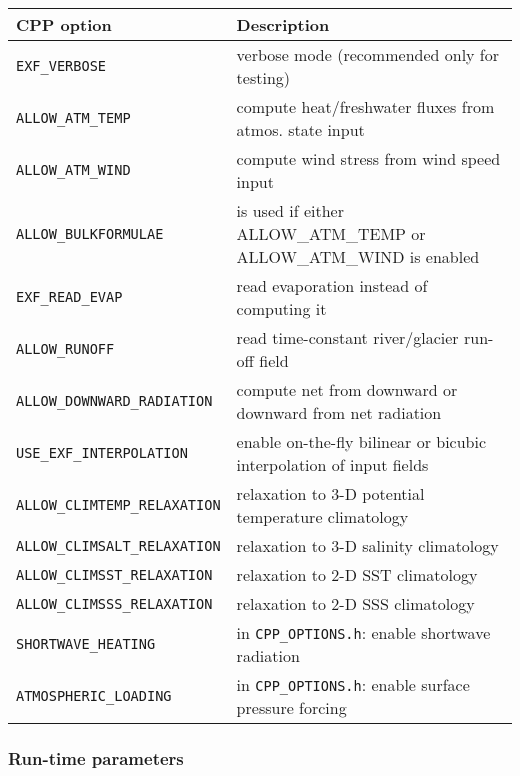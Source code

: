\begin{table}[b!]
  \label{tab:pkg:exf:cpp}
  {\footnotesize
    \begin{tabular}{|l|l|}
      \hline 
      \textbf{CPP option}  &  \textbf{Description}  \\
      \hline \hline
        \texttt{EXF\_VERBOSE} & 
          verbose mode (recommended only for testing) \\
        \texttt{ALLOW\_ATM\_TEMP} & 
          compute heat/freshwater fluxes from atmos. state input \\
        \texttt{ALLOW\_ATM\_WIND} & 
          compute wind stress from wind speed input\\
        \texttt{ALLOW\_BULKFORMULAE} & 
          is used if either ALLOW\_ATM\_TEMP or ALLOW\_ATM\_WIND is enabled \\
        \texttt{EXF\_READ\_EVAP} & read evaporation instead of computing it \\
        \texttt{ALLOW\_RUNOFF} & read time-constant river/glacier run-off field \\
        \texttt{ALLOW\_DOWNWARD\_RADIATION} & compute net from downward or downward from net radiation \\
        \texttt{USE\_EXF\_INTERPOLATION} & enable on-the-fly bilinear or bicubic interpolation of input fields \\
      \hline
        \texttt{ALLOW\_CLIMTEMP\_RELAXATION} & 
          relaxation to 3-D potential temperature climatology \\
        \texttt{ALLOW\_CLIMSALT\_RELAXATION} & 
          relaxation to 3-D salinity climatology \\
        \texttt{ALLOW\_CLIMSST\_RELAXATION} &
          relaxation to 2-D SST climatology \\
        \texttt{ALLOW\_CLIMSSS\_RELAXATION} &
          relaxation to 2-D SSS climatology  \\
      \hline
        \texttt{SHORTWAVE\_HEATING} & in \texttt{CPP\_OPTIONS.h}: enable shortwave radiation \\
        \texttt{ATMOSPHERIC\_LOADING} &  in \texttt{CPP\_OPTIONS.h}: enable surface pressure forcing \\
      \hline
    \end{tabular}
  }
  \caption{~}
\end{table}



\subsubsection{Run-time parameters
\label{sec:pkg:exf:runtime}}

